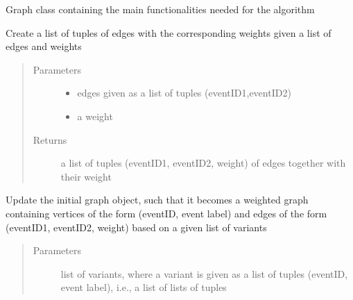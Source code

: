 \documentclass[letterpaper,10pt,english]{sphinxmanual}
\begin{document}
\begin{fulllineitems}
\label{\detokenize{graph:graph.graphTool.graphTool}}
Graph class containing the main functionalities needed for the algorithm

\begin{fulllineitems}
\label{\detokenize{graph:graph.graphTool.graphTool.createEdgeList}}
Create a list of tuples of edges with the corresponding weights given a list of edges and weights
\begin{quote}\begin{description}
\item[{Parameters}] \leavevmode\begin{itemize}
\item {} 
 \textendash{} edges given as a list of tuples (eventID1,eventID2)

\item {} 
 \textendash{} a weight

\end{itemize}

\item[{Returns}] \leavevmode
a list of tuples (eventID1, eventID2, weight) of edges together with their weight

\end{description}\end{quote}

\end{fulllineitems}


\begin{fulllineitems}
\label{\detokenize{graph:graph.graphTool.graphTool.createGraphFromVariants}}
Update the initial graph object, such that it becomes a weighted graph containing vertices of the form (eventID, event label) and edges of the form (eventID1, eventID2, weight) based on a given list of variants
\begin{quote}\begin{description}
\item[{Parameters}] \leavevmode
{} \textendash{} list of variants, where a variant is given as a list of tuples (eventID, event label), i.e., a list of lists of tuples


\end{description}
\end{quote}
\end{fulllineitems}
\end{fulllineitems}
\end{document}
